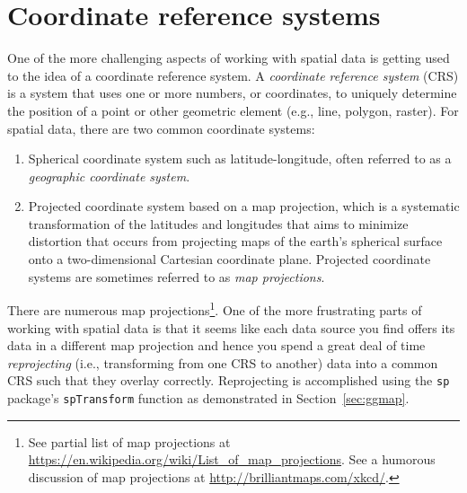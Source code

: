 \documentclass[12pt,oneside]{book}\usepackage[]{graphicx}\usepackage[]{color}
\begin{document}
\section{Coordinate reference systems}
One of the more challenging aspects of working with spatial data is getting used to the idea of a coordinate reference system. A \emph{coordinate reference system} (CRS) is a system that uses one or more numbers, or coordinates, to uniquely determine the position of a point or other geometric element (e.g., line, polygon, raster). For spatial data, there are two common coordinate systems:
\begin{enumerate}
\item Spherical coordinate system such as latitude-longitude, often referred to as a \emph{geographic coordinate system}.
\item Projected coordinate system based on a map projection, which is a systematic transformation of the latitudes and longitudes that aims to minimize distortion that occurs from projecting maps of the earth's spherical surface onto a two-dimensional Cartesian coordinate plane. Projected coordinate systems are sometimes referred to as \emph{map projections}.
\end{enumerate}
There are numerous map projections\footnote{See partial list of map projections at \url{https://en.wikipedia.org/wiki/List\_of\_map\_projections}. See a humorous discussion of map projections at \url{http://brilliantmaps.com/xkcd/}.}. One of the more frustrating parts of working with spatial data is that it seems like each data source you find offers its data in a different map projection and hence you spend a great deal of time \emph{reprojecting} (i.e., transforming from one CRS to another) data into a common CRS such that they overlay correctly. Reprojecting is accomplished using the \verb+sp+ package's \verb+spTransform+ function as demonstrated in Section~\ref{sec:ggmap}.
\end{document}
